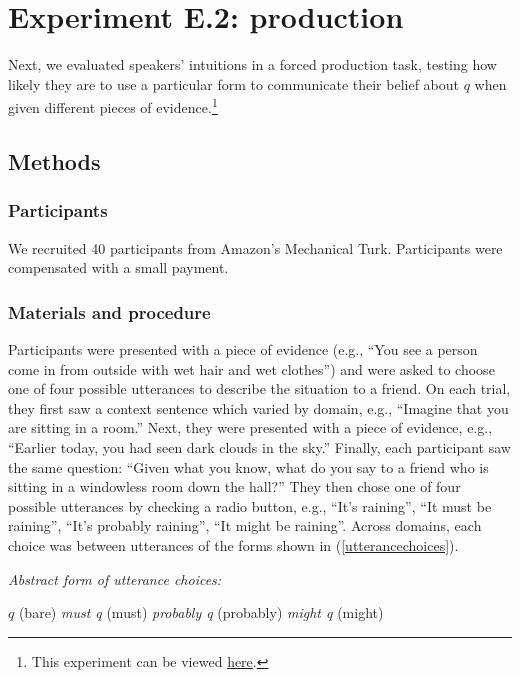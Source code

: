 \documentclass[11pt]{article}
\newcommand{\eref}[1]{(\ref{#1})}
\begin{document}
\section{Experiment E.2: production}

Next, we evaluated speakers' intuitions in a forced production task, testing how likely they are to use a particular form to communicate their belief about $q$ when given different pieces of evidence.\footnote{This experiment can be viewed \href{http://stanford.edu/~jdegen/71_modals_forced_production/modals.html}{here}.}

\subsection{Methods}

\subsubsection{Participants}

We recruited 40 participants from Amazon's Mechanical Turk. Participants were compensated with a small payment.

\subsubsection{Materials and procedure}

Participants were presented with a piece of evidence (e.g., ``You see a person come in from outside with wet hair and wet clothes'') and were asked to choose one of four possible utterances to describe the situation to a friend. On each trial, they first saw a context sentence which varied by domain, e.g., ``Imagine that you are sitting in a room.'' Next, they were presented with a piece of evidence, e.g., ``Earlier today, you had seen dark clouds in the sky.'' Finally, each participant saw the same question: ``Given what you know, what do you say to a friend who is sitting in a windowless room down the hall?'' They then chose one of four possible utterances by checking a radio button, e.g., ``It's raining'', ``It must be raining'', ``It's probably raining'', ``It might be raining''. Across domains, each choice was between utterances of the forms shown in \eref{utterancechoices}.

\begin{exe}
	\ex\label{utterancechoices} \emph{Abstract form of utterance choices:}
	\begin{xlist}
		\ex $q$ (bare)
		\ex \emph{must q} (must)
		\ex \emph{probably q} (probably)
		\ex \emph{might q} (might)
		\end{xlist}
		\end{exe}
		
\end{document}
